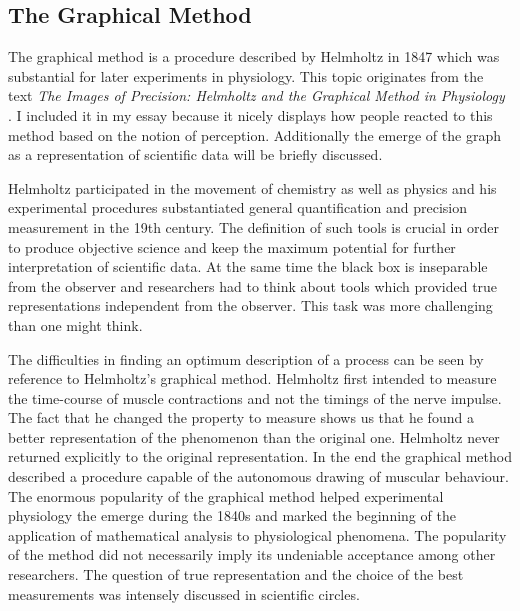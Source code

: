 \documentclass[12pt,a4paper]{article}
\begin{document}
\subsection*{The Graphical Method}

The graphical method is a procedure described by Helmholtz in 1847 which was substantial for later
experiments in physiology. This topic originates from the text {\it{The Images of Precision: Helmholtz
and the Graphical Method in Physiology}} \cite{holmes}. I included it in my essay because
it nicely displays how people reacted to this method based on the notion of perception.
Additionally the emerge of the graph as a representation of scientific data will be briefly discussed.

Helmholtz participated in the movement of chemistry as well as physics and his experimental
procedures substantiated general quantification and precision measurement in the 19th century.
The definition of such tools is crucial in order to produce objective science and keep the
maximum potential for further interpretation of scientific data.
At the same time the black box is inseparable from the observer and researchers had to
think about tools which provided true representations independent from the observer.
This task was more challenging than one might think.

The difficulties in finding an optimum description of a process can be seen by reference to
Helmholtz's graphical method. Helmholtz first intended to measure the time-course of
muscle contractions and not the timings of the nerve impulse.
The fact that he changed the property to measure shows us that he found a better
representation of the phenomenon than the original one. Helmholtz never returned explicitly to
the original representation. In the end the graphical method described a procedure
capable of the autonomous drawing of muscular behaviour. The enormous popularity of
the graphical method helped experimental physiology the emerge during the 1840s
and marked the beginning of the application of mathematical analysis to physiological
phenomena. The popularity of the method did not necessarily imply its undeniable acceptance among
other researchers. The question of true representation and the choice of the best measurements
was intensely discussed in scientific circles.
\end{document}
